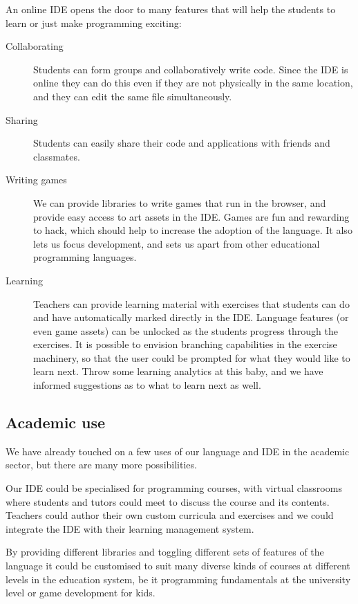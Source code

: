 An online IDE opens the door to many features that will help the students to
learn or just make programming exciting:
\begin{description}
  \item[Collaborating]
    Students can form groups and collaboratively write code.  Since the IDE is
    online they can do this even if they are not physically in the same
    location, and they can edit the same file simultaneously.
  \item[Sharing]
    Students can easily share their code and applications with friends and
    classmates.
  \item[Writing games] 
    We can provide libraries to write games that run in the browser, and
    provide easy access to art assets in the IDE. Games are fun and rewarding
    to hack, which should help to increase the adoption of the language. It
    also lets us focus development, and sets us apart from other educational
    programming languages.
  \item[Learning]
    Teachers can provide learning material with exercises that students can do
    and have automatically marked directly in the IDE. Language features (or
    even game assets) can be unlocked as the students progress through the
    exercises. It is possible to envision branching capabilities in the
    exercise machinery, so that the user could be prompted for what they would
    like to learn next.  Throw some learning analytics at this baby, and we
    have informed suggestions as to what to learn next as well.
\end{description}

\subsection{Academic use}

We have already touched on a few uses of our language and IDE in the academic
sector, but there are many more possibilities.

Our IDE could be specialised for programming courses, with virtual classrooms
where students and tutors could meet to discuss the course and its contents.
Teachers could author their own custom curricula and exercises and we could
integrate the IDE with their learning management system.

By providing different libraries and toggling different sets of features of the
language it could be customised to suit many diverse kinds of courses at
different levels in the education system, be it programming fundamentals at the
university level or game development for kids.

